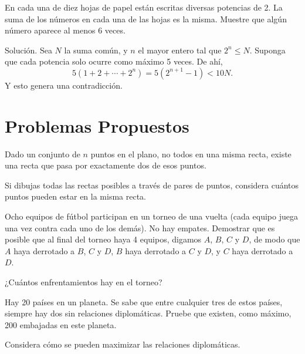 \documentclass[11pt]{scrartcl}
\begin{document}
\begin{example}
    En cada una de diez hojas de papel están escritas diversas potencias de 2. La suma de los números en cada una de las hojas es la misma. Muestre que algún número aparece al menos 6 veces.
\end{example}
Solución. Sea \(N\) la suma común, y \(n\) el mayor entero tal que \(2^n \leq N\). Suponga que cada potencia solo ocurre como máximo 5 veces. De ahí,
\[
5(1 + 2 + \cdots + 2^n) = 5(2^{n+1} - 1) < 10N.
\]
Y esto genera una contradicción.


\section{Problemas Propuestos}

\begin{problem}
    Dado un conjunto de \(n\) puntos en el plano, no todos en una misma recta, existe una recta que pasa por exactamente dos de esos puntos.
    \begin{hint}
    Si dibujas todas las rectas posibles a través de pares de puntos, considera cuántos puntos pueden estar en la misma recta.
    \end{hint}
\end{problem}
    
\begin{problem}
Ocho equipos de fútbol participan en un torneo de una vuelta (cada equipo juega una vez contra cada uno de los demás).  No hay empates.  Demostrar que es posible que al final del torneo haya 4 equipos, digamos $A$, $B$, $C$ y $D$, de modo que $A$ haya derrotado a $B$, $C$ y $D$, $B$ haya derrotado a $C$ y $D$, y $C$ haya derrotado a $D$.
    \begin{hint}
    ¿Cuántos enfrentamientos hay en el torneo?
    \end{hint}
\end{problem}
    
\begin{problem}
    Hay 20 países en un planeta. Se sabe que entre cualquier tres de estos países, siempre hay dos sin relaciones diplomáticas. Pruebe que existen, como máximo, 200 embajadas en este planeta.
    \begin{hint}
    Considera cómo se pueden maximizar las relaciones diplomáticas.
    \end{hint}
\end{problem}
\end{document}
